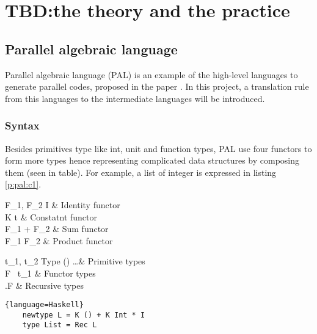 \chapter{TBD:the theory and the practice}
\section{Parallel algebraic language} \label{b:pal}
Parallel algebraic language (PAL) is an example of the high-level languages to generate parallel codes, proposed in the paper \cite{authorAlgebraicMultipartyProtocol2018}. In this project, a translation rule from this languages to the intermediate languages will be introduced.
\subsection{Syntax}
Besides primitives type like int, unit and function types, PAL use four functors to form more types hence representing complicated data structures by composing them (seen in table). For example, a list of integer is expressed in listing \ref{p:pal:c1}.
\begin{table}[ht]
\begin{grammar}{F_1, F_2 \Coloneqq}{}
    I & Identity functor\\
    K t & Constatnt functor\\
    F_1 + F_2 & Sum functor\\
    F_1 \times F_2 & Product functor
\end{grammar}
\hfill
\begin{grammar}{t_1, t_2 \Coloneqq}{Type}
    () \mid {} \mid \dots & Primitive types\\
    F \ t_1 & Functor types\\
    \mu .F & Recursive types\\
\end{grammar}
\caption{Functor and Type definitions}
\end{table}
\begin{listing}[ht]
\begin{lstlisting}{language=Haskell}
    newtype L = K () + K Int * I
    type List = Rec L
\end{lstlisting}
\caption{Type of integer list in PAL}
\label{p:pal:c1}
\end{listing}

